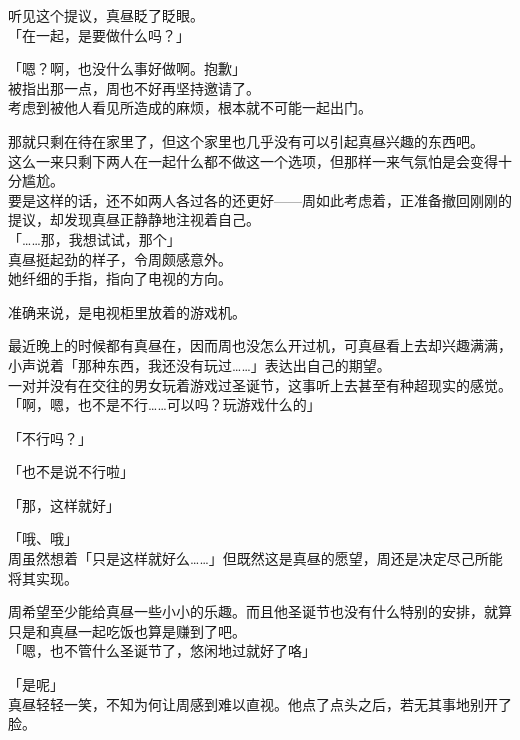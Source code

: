 听见这个提议，真昼眨了眨眼。\\

「在一起，是要做什么吗？」

「嗯？啊，也没什么事好做啊。抱歉」\\

被指出那一点，周也不好再坚持邀请了。\\

考虑到被他人看见所造成的麻烦，根本就不可能一起出门。

那就只剩在待在家里了，但这个家里也几乎没有可以引起真昼兴趣的东西吧。\\

这么一来只剩下两人在一起什么都不做这一个选项，但那样一来气氛怕是会变得十分尴尬。\\

要是这样的话，还不如两人各过各的还更好——周如此考虑着，正准备撤回刚刚的提议，却发现真昼正静静地注视着自己。\\

「……那，我想试试，那个」\\

真昼挺起劲的样子，令周颇感意外。\\

她纤细的手指，指向了电视的方向。

准确来说，是电视柜里放着的游戏机。

最近晚上的时候都有真昼在，因而周也没怎么开过机，可真昼看上去却兴趣满满，小声说着「那种东西，我还没有玩过……」表达出自己的期望。\\

一对并没有在交往的男女玩着游戏过圣诞节，这事听上去甚至有种超现实的感觉。\\

「啊，嗯，也不是不行……可以吗？玩游戏什么的」

「不行吗？」

「也不是说不行啦」

「那，这样就好」

「哦、哦」\\

周虽然想着「只是这样就好么……」但既然这是真昼的愿望，周还是决定尽己所能将其实现。

周希望至少能给真昼一些小小的乐趣。而且他圣诞节也没有什么特别的安排，就算只是和真昼一起吃饭也算是赚到了吧。\\

「嗯，也不管什么圣诞节了，悠闲地过就好了咯」

「是呢」\\

真昼轻轻一笑，不知为何让周感到难以直视。他点了点头之后，若无其事地别开了脸。
